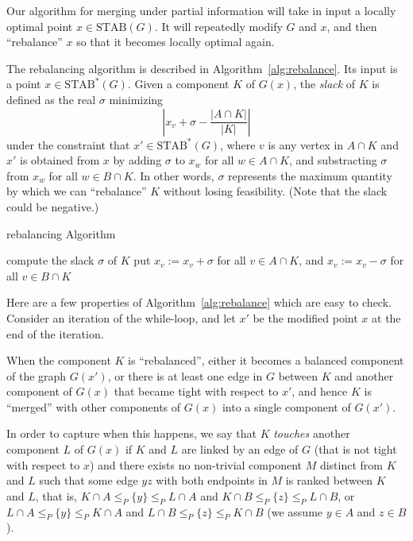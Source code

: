 \documentclass{article} \usepackage{fullpage}
\newcommand{\STAB}{\mathrm{STAB}}
\begin{document}
Our algorithm for merging under partial information will take in input a locally optimal point $x \in \STAB(G)$. It will repeatedly modify $G$ and $x$, and then ``rebalance'' $x$ so that it becomes locally optimal again.

The rebalancing algorithm is described in Algorithm~\ref{alg:rebalance}. Its input is a point $x \in \STAB^*(G)$. Given a component $K$ of $G(x)$, the {\sl slack} of $K$ is defined as the real $\sigma$ minimizing 
$$\left|x_{v} + \sigma - \frac{|A \cap K|}{|K|}\right|$$
under the constraint that $x' \in \STAB^*(G)$, where $v$ is any vertex in $A\cap K$ and $x'$ is obtained from $x$ by adding $\sigma$ to $x_{w}$ for all $w\in A\cap K$, and substracting $\sigma$ from $x_{w}$ for all $w\in B\cap K$. In other words, $\sigma$ represents the maximum quantity by which we can ``rebalance'' $K$ without losing feasibility. (Note that the slack could be negative.)

\begin{algorithm}[h!t]
\caption{rebalancing Algorithm} \label{alg:rebalance}
\begin{algorithmic}[1]
\STATE \label{line:compute_slack} compute the slack $\sigma$ of $K$
\STATE \label{line:add_slack} put $x_{v} := x_{v} + \sigma$ for all $v \in A \cap K$, and $x_{v} := x_{v} - \sigma$ for all $v \in B \cap K$
\ENDWHILE
\end{algorithmic}
\end{algorithm}

Here are a few properties of Algorithm~\ref{alg:rebalance} which are easy to check. Consider an iteration of the while-loop, and let $x'$ be the modified point $x$ at the end of the iteration. 

When the component $K$ is ``rebalanced'', either it becomes a balanced component of the graph $G(x')$, or there is at least one edge in $G$ between $K$ and another component of $G(x)$ that became tight with respect to $x'$, and hence $K$ is ``merged'' with other components of $G(x)$ into a single component of $G(x')$. 

In order to capture when this happens, we say that $K$ {\sl touches\/} another component $L$ of $G(x)$ if $K$ and $L$ are linked by an edge of $G$ (that is not tight with respect to $x$) and there exists no non-trivial component $M$ distinct from $K$ and $L$ such that some edge $yz$ with both endpoints in $M$ is ranked between $K$ and $L$, that is, $K \cap A \leqslant_P \{y\} \leqslant_P L \cap A$ and $K \cap B \leqslant_P \{z\} \leqslant_P L \cap B$, or $L \cap A \leqslant_P \{y\} \leqslant_P K \cap A$ and $L \cap B \leqslant_P \{z\} \leqslant_P K \cap B$ (we assume $y \in A$ and $z \in B$). 
\end{document}
